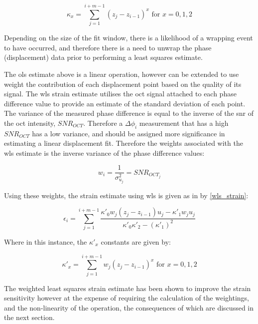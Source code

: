 \begin{equation}
	\label{ols_k}
	\kappa_x = \sum \limits_{j=1}^{i+m-1} (z_j - z_{i-1})^x \text{   for   } x = 0,1,2
\end{equation}

Depending on the size of the fit window, there is a likelihood of a wrapping event to have occurred, and therefore there is a need to unwrap the phase (displacement) data prior to performing a least squares estimate. 

The \ac{ols} estimate above is a linear operation, however can be extended to use weight the contribution of each displacement point based on the quality of its signal. The \ac{wls} strain estimate utilises the \ac{oct} signal attached to each phase difference value to provide an estimate of the standard deviation of each point. The variance of the measured phase difference is equal to the inverse of the \ac{snr} of the \ac{oct} intensity, $SNR_{OCT}$. Therefore a $\Delta \phi_i$ measurement that has a high $SNR_{OCT}$ has a low variance, and should be assigned more significance in estimating a linear displacement fit. Therefore the weights associated with the \ac{wls} estimate is the inverse variance of the phase difference values:

\begin{equation}
	\label{wls_w}
	w_i = \frac{1}{\sigma_{u_j}^2} = SNR_{OCT_j}
\end{equation}

Using these weights, the strain estimate using \ac{wls} is given as in \cite{kennedy_strain_2012} by \autoref{wls_strain}:

\begin{equation}
	\label{wls_strain}
	\epsilon_i = \sum \limits_{j=1}^{i+m-1} \frac{\kappa'_0 w_j (z_j - z_{i-1}) u_j - \kappa'_1 w_	j u_j}{\kappa'_0 \kappa'_2 - (\kappa'_1)^2}
\end{equation}

Where in this instance, the $\kappa'_x$ constants are given by:

\begin{equation}
	\label{wls_k}
	\kappa'_x = \sum \limits_{j=1}^{i+m-1} w_j (z_j - z_{i-1})^x \text{   for   } x=0,1,2
\end{equation}

The weighted least squares strain estimate has been shown to improve the strain sensitivity \cite{kennedy_strain_2012} however at the expense of requiring the calculation of the weightings, and the non-linearity of the operation, the consequences of which are discussed in the next section.


